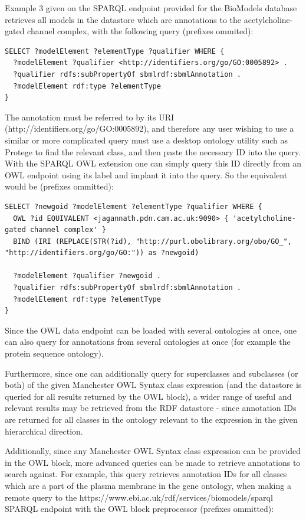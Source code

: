 \documentclass{article}
\begin{document}
Example 3 given on the SPARQL endpoint provided for the BioModels database
retrieves all models in the datastore which are annotations to the
acetylcholine-gated channel complex, with the following query (prefixes ommited):

\begin{lstlisting}
SELECT ?modelElement ?elementType ?qualifier WHERE { 
  ?modelElement ?qualifier <http://identifiers.org/go/GO:0005892> .  
  ?qualifier rdfs:subPropertyOf sbmlrdf:sbmlAnnotation . 
  ?modelElement rdf:type ?elementType 
}
\end{lstlisting}

The annotation must be referred to by its URI
(http://identifiers.org/go/GO:0005892), and therefore any user wishing to use a
similar or more complicated query must use a desktop ontology utility such as
Protege to find the relevant class, and then paste the necessary ID into the query. 
With the SPARQL OWL extension one can simply query this ID directly from an OWL
endpoint using its label and implant it into the query. So the equivalent would 
be (prefixes ommitted):

\begin{lstlisting}
SELECT ?newgoid ?modelElement ?elementType ?qualifier WHERE {
  OWL ?id EQUIVALENT <jagannath.pdn.cam.ac.uk:9090> { 'acetylcholine-gated channel complex' }
  BIND (IRI (REPLACE(STR(?id), "http://purl.obolibrary.org/obo/GO_", "http://identifiers.org/go/GO:")) as ?newgoid)

  ?modelElement ?qualifier ?newgoid .
  ?qualifier rdfs:subPropertyOf sbmlrdf:sbmlAnnotation .
  ?modelElement rdf:type ?elementType
}
\end{lstlisting}

Since the OWL data endpoint can be loaded with several ontologies at once, 
one can also query for annotations from several ontologies at once (for example
the protein sequence ontology).

Furthermore, since one can additionally query for superclasses and subclasses
(or both) of the given Manchester OWL Syntax class expression (and the datastore 
is queried for all results returned by the OWL block), a wider range of useful and
relevant results may be retrieved from the RDF datastore - since annotation IDs
are returned for all classes in the ontology relevant to the expression in the
given hierarchical direction.

Additionally, since any Manchester OWL Syntax class expression can be provided 
in the OWL block, more advanced queries can be made to retrieve annotations to
search against. For example, this query retrieves annotation IDs for all classes
which are a part of the plasma membrane in the gene ontology, when making a
remote query to the https://www.ebi.ac.uk/rdf/services/biomodels/sparql SPARQL
endpoint with the OWL block preprocessor (prefixes ommitted):
\end{document}
